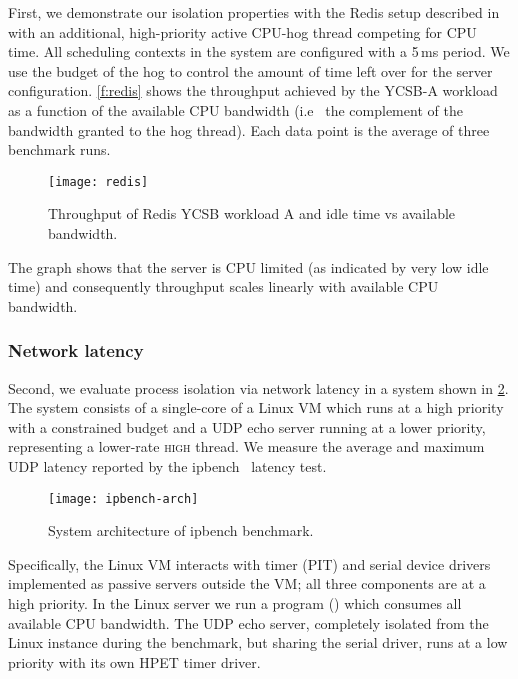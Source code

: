 First, we demonstrate our isolation properties with the Redis setup described in
 with an additional, high-priority active CPU-hog thread
competing for \gls{CPU} time.  All scheduling contexts in the system are configured with a
5\,ms period. We use the budget of the hog to control the amount of time left over
for the server configuration. \autoref{f:redis} shows the throughput
achieved by the YCSB-A workload as a function of the available CPU
bandwidth (i.e \ the complement of the bandwidth granted to the hog
thread). Each data point is the average of three benchmark runs.

\begin{figure}[h]
  \centering
  \texttt{[image: redis]}
  \caption{Throughput of Redis YCSB workload A and idle time vs available bandwidth.}
  \label{f:redis}
\end{figure}

The graph shows that the server is CPU limited (as indicated by very low idle time)
and consequently throughput scales linearly with available CPU
bandwidth.

\subsubsection{Network latency}

Second, we evaluate process isolation via network latency in a system shown in \cref{f:ipbench-arch}. 
The system consists of a single-core of a Linux \gls{VM} which runs at a high priority with a
constrained budget and a \gls{UDP} echo server running at a lower priority,
representing a lower-rate \textsc{high} thread. We
measure the average  and maximum UDP latency reported by the
ipbench~\citep{Wienand_Macpherson_04} latency test.

\begin{figure}[h]
    \centering
    \texttt{[image: ipbench-arch]}
    \caption{System architecture of ipbench benchmark.}
    \label{f:ipbench-arch}
\end{figure}


Specifically, the Linux VM interacts with timer (PIT) and serial device drivers implemented as
passive servers outside the \gls{VM}; all three components are at a high priority. In the Linux server we
run a program () which consumes all available
CPU bandwidth.  The UDP echo server, completely isolated from the Linux instance during the
benchmark, but sharing the
serial driver, runs at a low priority with its own HPET timer
driver.

